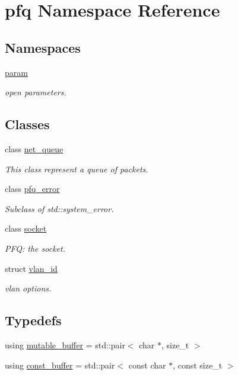 \hypertarget{namespacepfq}{}\section{pfq Namespace Reference}
\label{namespacepfq}
\subsection*{Namespaces}
\begin{DoxyCompactItemize}
\item 
 \hyperlink{namespacepfq_1_1param}{param}
\begin{DoxyCompactList}\small\item\em open parameters. \end{DoxyCompactList}\end{DoxyCompactItemize}
\subsection*{Classes}
\begin{DoxyCompactItemize}
\item 
class \hyperlink{classpfq_1_1net__queue}{net\+\_\+queue}
\begin{DoxyCompactList}\small\item\em This class represent a queue of packets. \end{DoxyCompactList}\item 
class \hyperlink{classpfq_1_1pfq__error}{pfq\+\_\+error}
\begin{DoxyCompactList}\small\item\em Subclass of std\+::system\+\_\+error. \end{DoxyCompactList}\item 
class \hyperlink{classpfq_1_1socket}{socket}
\begin{DoxyCompactList}\small\item\em P\+FQ\+: the socket. \end{DoxyCompactList}\item 
struct \hyperlink{structpfq_1_1vlan__id}{vlan\+\_\+id}
\begin{DoxyCompactList}\small\item\em vlan options. \end{DoxyCompactList}\end{DoxyCompactItemize}
\subsection*{Typedefs}
\begin{DoxyCompactItemize}
\item 
using \hyperlink{namespacepfq_ad7b88920eaf729154354741132483ea8}{mutable\+\_\+buffer} = std\+::pair$<$ char $\ast$, size\+\_\+t $>$
\item 
using \hyperlink{namespacepfq_ac835a1bd09b4cbaba61c100b50d0a99f}{const\+\_\+buffer} = std\+::pair$<$ const char $\ast$, const size\+\_\+t $>$
\end{DoxyCompactItemize}
